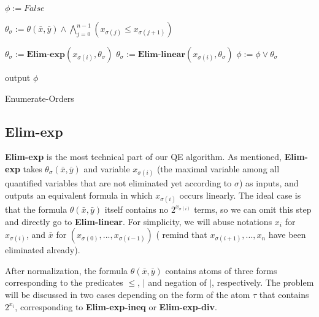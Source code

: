 \begin{algorithm}[t]
    \SetAlgoLined
    $\phi := \textit{False}$\;
    {
        $\theta_{\sigma}:=  \theta(\bar{x},\bar{y})\wedge \bigwedge_{j=0}^{n-1}(x_{\sigma(j)}\le x_{\sigma(j+1)})$\;
        
        {
            $\theta_{\sigma}:= \textbf{Elim-exp}(x_{\sigma(i)},\theta_{\sigma})$\;
            $\theta_{\sigma}:= \textbf{Elim-linear}(x_{\sigma(i)},\theta_{\sigma})$\;
        }
        $\phi :=  \phi \vee \theta_{\sigma}$\;
    }
    output $\phi$
    \caption{Enumerate-Orders}
\end{algorithm}

\subsection{Elim-exp}

\textbf{Elim-exp} is the most technical part of our QE algorithm. As mentioned, \textbf{Elim-exp} takes $\theta_{\sigma}(\bar{x},\bar{y})$ and  variable $x_{\sigma(i)}$ (the maximal variable among all quantified variables that are not eliminated yet according to $\sigma$) as inputs, and outputs an equivalent formula in which $x_{\sigma(i)}$ occurs linearly.
The ideal case is that the formula $\theta(\bar{x},\bar{y})$ itself contains no $2^{x_{\sigma(i)}}$ terms, so we can omit this step and directly go to \textbf{Elim-linear}.
For simplicity, we will abuse notations $x_i$ for $x_{\sigma(i)}$, and $\bar{x}$ for $(x_{\sigma(0)},...,x_{\sigma(i-1)})$ ( remind that $x_{\sigma(i+1)},...,x_n$ have been eliminated already).

After normalization, the formula $\theta(\bar{x},\bar{y})$ contains atoms of three forms corresponding to 
the predicates $\le$, $|$ and negation of $|$, respectively.
The problem will be discussed in two cases depending on the form of the atom $\tau$ that contains $2^{x_i}$, 
corresponding to \textbf{Elim-exp-ineq} or \textbf{Elim-exp-div}. 

